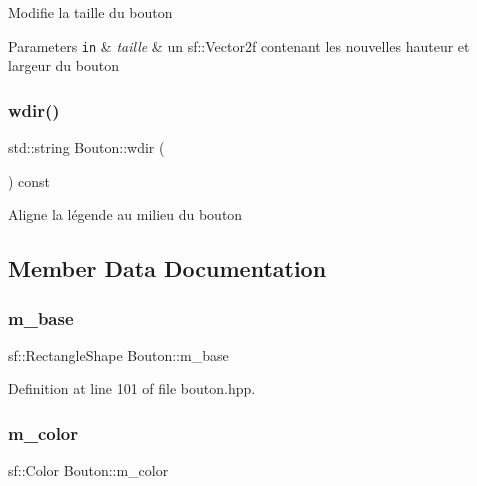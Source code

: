 Modifie la taille du bouton 
\begin{DoxyParams}[1]{Parameters}
\mbox{\tt in}  & {\em taille} & un sf\+::\+Vector2f contenant les nouvelles hauteur et largeur du bouton \\
\hline
\end{DoxyParams}
\mbox{\label{classBouton_aab0ffe436ee4e87f556f743bda7cd2b8}} 
\subsubsection{\texorpdfstring{wdir()}{wdir()}}
{\footnotesize\ttfamily std\+::string Bouton\+::wdir (\begin{DoxyParamCaption}{ }\end{DoxyParamCaption}) const\hspace{0.3cm}{\ttfamily [protected]}}

Aligne la légende au milieu du bouton 

\subsection{Member Data Documentation}
\mbox{\label{classBouton_af2eabc621f9ca506ecc480931a54939a}} 
\subsubsection{\texorpdfstring{m\+\_\+base}{m\_base}}
{\footnotesize\ttfamily sf\+::\+Rectangle\+Shape Bouton\+::m\+\_\+base\hspace{0.3cm}{\ttfamily [protected]}}



Definition at line 101 of file bouton.\+hpp.

\mbox{\label{classBouton_ac83f8fb8ff41a2df355ce974e95460ee}} 
\subsubsection{\texorpdfstring{m\+\_\+color}{m\_color}}
{\footnotesize\ttfamily sf\+::\+Color Bouton\+::m\+\_\+color\hspace{0.3cm}{\ttfamily [protected]}}



